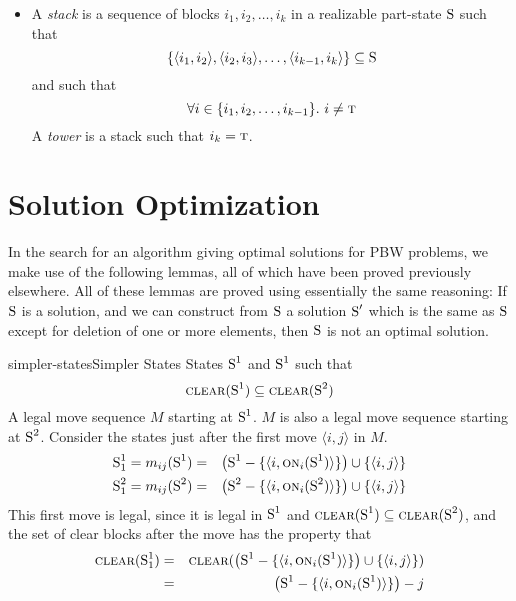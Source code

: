 \documentclass{article}
\newcommand{\have}{{.~}}
\newcommand{\bstate}{{\mbox{\cal S}}}
\newcommand{\tabtop}{{\mbox{\sc t}}}
\newcommand{\bclear}{{\mbox{\sc clear}}}
\newcommand{\bon}{{\mbox{\sc on}}}
\begin{document}
\begin{itemize}
\item A {\em stack} is a sequence of blocks $i_1, i_2, \ldots, i_k$
in a realizable
part-state $\bstate$ such that $$
  \{ \langle i_1, i_2 \rangle, \langle i_2, i_3 \rangle, \ldots,
  \langle i_{k-1}, i_k \rangle \} \subseteq \bstate
$$
and such that $$
  \forall i \in \{ i_1, i_2, \ldots, i_{k-1} \} \have
    i \neq \tabtop
$$
A {\em tower} is a stack such that $i_k = \tabtop$.

\end{itemize}

\section{Solution Optimization}

In the search for an algorithm giving optimal solutions for PBW
problems, we make use of the following lemmas, all of which
have been proved previously elsewhere.  All of these lemmas are
proved using essentially the same reasoning:  If $\bstate$ is a
solution, and we can construct from $\bstate$ a solution $\bstate'$ which
is the same as $\bstate$ except for deletion of one or more elements,
then $\bstate$ is not an optimal solution.

\begin{lemma}{simpler-states}{Simpler States}
\given
States $\bstate^1$ and $\bstate^1$ such that $$
\bclear(\bstate^1) \subseteq \bclear(\bstate^2)
$$
A legal move sequence $M$ starting at $\bstate^1$.
\prove
$M$ is also a legal move sequence starting at $\bstate^2$.
\proof
Consider the states just after the first move $\langle i, j \rangle$ in $M$.
\begin{eqnarray*}
  \bstate^1_1 = m_{i j}(\bstate^1) &=&
  \left ( \bstate^1 - \{ \langle i, \bon_i(\bstate^1) \rangle \} \right )
  \cup \{ \langle i, j \rangle \} \\
  \bstate^2_1 = m_{i j}(\bstate^2) &=&
  \left ( \bstate^2 - \{ \langle i, \bon_i(\bstate^2) \rangle \} \right )
  \cup \{ \langle i, j \rangle \}
\end{eqnarray*}
This first move is legal, since it is legal in $\bstate^1$ and
$\bclear(\bstate^1) \subseteq \bclear(\bstate^2)$, and the set of
clear blocks after the move has the property that
\begin{eqnarray*}
  \bclear(\bstate^1_1) &=& \bclear (
  \left ( \bstate^1 - \{ \langle i, \bon_i(\bstate^1) \rangle \} \right )
  \cup \{ \langle i, j \rangle \} ) \\
  &=&  \left ( \bstate^1 - \{ \langle i, \bon_i(\bstate^1) \rangle \} \right )
  - j
\end{eqnarray*}
\end{lemma}
\end{document}
